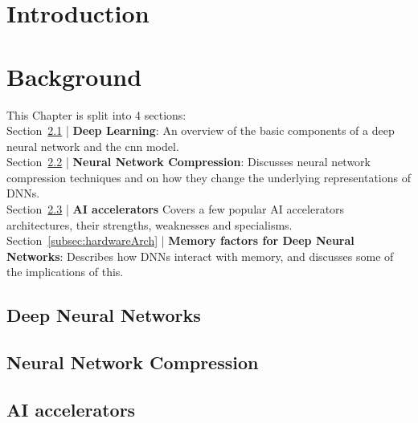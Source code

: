 \documentclass[11pt]{report}
\begin{document}
\thispagestyle{empty}
\pagebreak

\tableofcontents
\thispagestyle{empty}
\pagebreak

\printnoidxglossary[type=acronym, nonumberlist]
\thispagestyle{empty}

\newpage
\setcounter{page}{1}

\chapter{Introduction}




\pagebreak
\chapter{Background}

This Chapter is split into 4 sections:\\
Section~\ref{subsec:deepLearning} | \textbf{Deep Learning}: An overview of the basic components of a deep neural network and the \acrshort{cnn} model.\\
Section~\ref{subsec:compressionTypes} | \textbf{Neural Network Compression}: Discusses neural network compression techniques and on how they change the underlying representations of DNNs.\\
Section~\ref{subsec:AIaccelerators} | \textbf{AI accelerators} Covers a few popular AI accelerators architectures, their strengths, weaknesses and specialisms.\\
Section~\ref{subsec:hardwareArch} | \textbf{Memory factors for Deep Neural Networks}: Describes how DNNs interact with memory, and discusses some of the implications of this.

\section{Deep Neural Networks}\label{subsec:deepLearning}


\newpage
\section{Neural Network Compression}\label{subsec:compressionTypes}


\newpage
\section{AI accelerators}\label{subsec:AIaccelerators}

\end{document}
